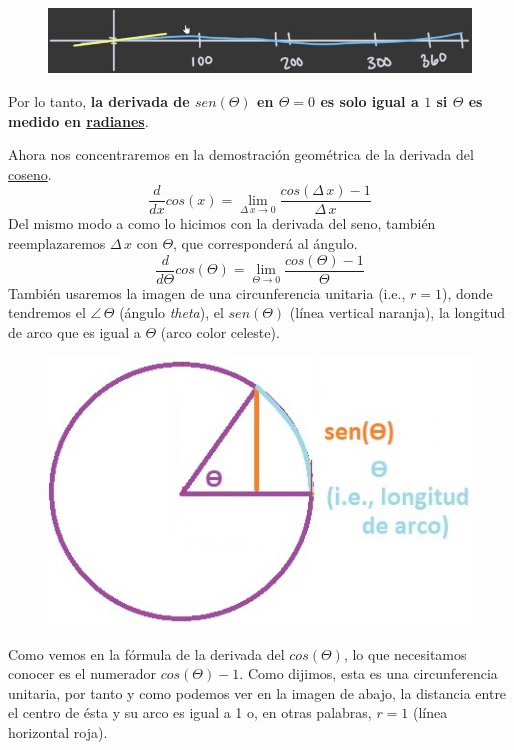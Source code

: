 \documentclass[12pt]{article}
\begin{document}
\begin{figure}[hbt!]
\centering
\includegraphics[scale=0.7]{img/deriv_sin_degrees.jpg}
\end{figure}

Por lo tanto, \textbf{la derivada de $sen(\Theta)$ en $\Theta = 0$ es solo igual a $1$ si $\Theta$ es medido en \underline{radianes}}.


Ahora nos concentraremos en la demostración geométrica de la derivada del \underline{coseno}.
\[\frac{d}{dx}cos(x) = \lim_{\Delta \, x \to 0} \frac{cos(\Delta \, x) - 1}{\Delta \, x}\]
Del mismo modo a como lo hicimos con la derivada del seno, también reemplazaremos $\Delta \, x$ con $\Theta$, que corresponderá al ángulo.
\[\frac{d}{d\Theta}cos(\Theta) = \lim_{\Theta \to 0} \frac{cos(\Theta) - 1}{\Theta}\]
También usaremos la imagen de una circunferencia unitaria (i.e., $r = 1$), donde tendremos el $\angle \, \Theta$ (ángulo \textit{theta}), el $sen(\Theta)$ (línea vertical naranja), la longitud de arco que es igual a $\Theta$ (arco color celeste).

\begin{figure}[hbt!]
\centering
\includegraphics[scale=0.7]{img/geom_proof_cos.jpg}
\end{figure}

Como vemos en la fórmula de la derivada del $cos(\Theta)$, lo que necesitamos conocer es el numerador $cos(\Theta) - 1$. Como dijimos, esta es una circunferencia unitaria, por tanto y como podemos ver en la imagen de abajo, la distancia entre el centro de ésta y su arco es igual a 1 o, en otras palabras, $r = 1$ (línea horizontal roja). 
\end{document}
